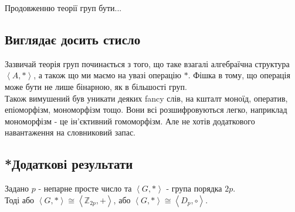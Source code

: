 \documentclass{math_library}
\begin{document}
Продовженню теорії груп бути...

\subsection*{Виглядає досить стисло}
Зазвичай теорія груп починається з того, що таке взагалі алгебраїчна структура $\left<A,* \right>$, а також що ми маємо на увазі операцію $*$. Фішка в тому, що операція може бути не лише бінарною, як в більшості груп.\\
Також вимушений був уникати деяких fancy слів, на кшталт моноїд, оператив, епіоморфізм, мономорфізм тощо. Вони всі розшифровуються легко, наприклад мономорфізм - це ін'єктивний гомоморфізм. Але не хотів додаткового навантаження на словниковий запас.
\newpage
\subsection{*Додаткові результати}
\begin{theorem}
Задано $p$ - непарне просте число та $\left< G, * \right>$ - група порядка $2p$.\\
Тоді або $\left< G, * \right> \cong \left< \mathbb{Z}_{2p},+ \right>$, або $\left< G, * \right> \cong \left< D_{p},\circ \right>$.
\end{theorem}
\end{document}
